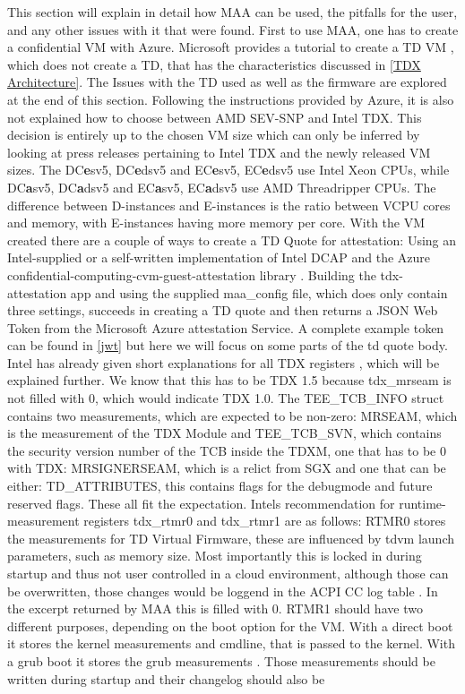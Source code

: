 This section will explain in detail how MAA can be used, the pitfalls for the user, and any other issues with it that were found. First to use MAA, one has to create a confidential VM with Azure. Microsoft provides a tutorial to create a TD VM \cite{chasecrum_github_create_2024}, which does not create a TD, that has the characteristics discussed in \cref{TDX Architecture}. The Issues with the TD used as well as the firmware are explored at the end of this section. Following the instructions provided by Azure, it is also not explained how to choose between AMD SEV-SNP and Intel TDX. This decision is entirely up to the chosen VM size which can only be inferred by looking at press releases pertaining to Intel TDX and the newly released VM sizes. The DC\textbf{e}sv5, DC\textbf{e}dsv5 and EC\textbf{e}sv5, EC\textbf{e}dsv5 use Intel Xeon CPUs, while DC\textbf{a}sv5, DC\textbf{a}dsv5 and EC\textbf{a}sv5, EC\textbf{a}dsv5 use AMD Threadripper CPUs. The difference between D-instances and E-instances is the ratio between VCPU cores and memory, with E-instances having more memory per core. With the VM created there are a couple of ways to create a TD Quote for attestation: Using an Intel-supplied or a self-written implementation of Intel DCAP and the Azure confidential-computing-cvm-guest-attestation library \cite{microsoft_corporation_azureconfidential-computing-cvm-guest-attestation_nodate}. Building the tdx-attestation app and using the supplied maa\_config file, which does only contain three settings, succeeds in creating a TD quote and then returns a JSON Web Token from the Microsoft Azure attestation Service. A complete example token can be found in \cref{jwt} but here we will focus on some parts of the td quote body. Intel has already given short explanations for all TDX registers \cite{intel_corporation_dcap_2024-1}, which will be explained further. We know that this has to be TDX 1.5 because tdx\_mrseam is not filled with 0, which would indicate TDX 1.0. The TEE\_TCB\_INFO struct contains two measurements, which are expected to be non-zero: MRSEAM, which is the measurement of the TDX Module and TEE\_TCB\_SVN, which contains the security version number of the TCB inside the TDXM, one that has to be 0 with TDX: MRSIGNERSEAM, which is a relict from SGX and one that can be either: TD\_ATTRIBUTES, this contains flags for the debugmode and future reserved flags. These all fit the expectation. Intels recommendation for runtime-measurement registers tdx\_rtmr0 and tdx\_rtmr1 are as follows: RTMR0 stores the measurements for TD Virtual Firmware, these are influenced by tdvm launch parameters, such as memory size. Most importantly this is locked in during startup and thus not user controlled in a cloud environment, although those can be overwritten, those changes would be loggend in the ACPI CC log table \cite{uefi_forum_inc_acpi_docu_2022}. In the excerpt returned by MAA this is filled with 0. RTMR1 should have two different purposes, depending on the boot option for the VM. With a direct boot it stores the kernel measurements and cmdline, that is passed to the kernel. With a grub boot it stores the grub measurements \cite{intel_corporation_tdx-virtual-firmware-design-guide-rev-004-20231206pdf_2023}. Those measurements should be written during startup and their changelog should also be 